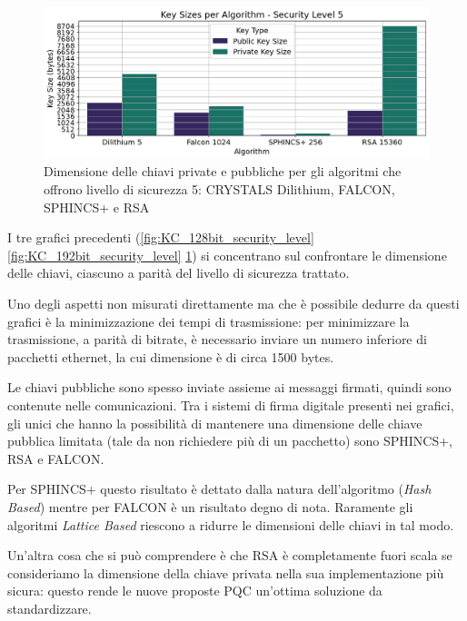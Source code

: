 \begin{figure}[H]
    \centering
    \includegraphics[width=1\textwidth]{Immagini/20240822_i9/Key_Sizes/KC_256bit_security_level.png}
    \caption{Dimensione delle chiavi private e pubbliche per gli algoritmi che offrono livello di sicurezza 5: CRYSTALS Dilithium, FALCON, SPHINCS+ e RSA}
    \label{fig:KC_256bit_security_level}
\end{figure}

I tre grafici precedenti (\ref{fig:KC_128bit_security_level} \ref{fig:KC_192bit_security_level} \ref{fig:KC_256bit_security_level}) si concentrano sul confrontare le dimensione delle chiavi, ciascuno a parità del livello di sicurezza trattato.

Uno degli aspetti non misurati direttamente ma che è possibile dedurre da questi grafici è la minimizzazione dei tempi di trasmissione: per minimizzare la trasmissione, a parità di bitrate, è necessario inviare un numero inferiore di pacchetti ethernet, la cui dimensione è di circa 1500 bytes. 

Le chiavi pubbliche sono spesso inviate assieme ai messaggi firmati, quindi sono contenute nelle comunicazioni. Tra i sistemi di firma digitale presenti nei grafici, gli unici che hanno la possibilità di mantenere una dimensione delle chiave pubblica limitata (tale da non richiedere più di un pacchetto) sono SPHINCS+, RSA e FALCON.

Per SPHINCS+ questo risultato è dettato dalla natura dell'algoritmo (\textit{Hash Based}) mentre per FALCON è un risultato degno di nota. Raramente gli algoritmi \textit{Lattice Based} riescono a ridurre le dimensioni delle chiavi in tal modo.

Un'altra cosa che si può comprendere è che RSA è completamente fuori scala se consideriamo la dimensione della chiave privata nella sua implementazione più sicura: questo rende le nuove proposte PQC un'ottima soluzione da standardizzare.

